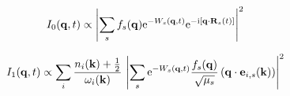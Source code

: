 \[ I_0(\mathbf{q}, t) \propto \left| \sum_s f_s(\mathbf{q}) \mathrm{e}^{-W_s(\mathbf{q},t)} \mathrm{e}^{-\mathrm{i}[\mathbf{q}\cdot\mathbf{R}_s(t)]} \right| ^2 \]

\[ I_1(\mathbf{q},t) \propto \sum_i \frac{n_i(\mathbf{k})+\frac{1}{2}}{\omega_i(\mathbf{k})}\,\left| \sum_s \mathrm{e}^{-W_s(\mathbf{q},t)} \frac{f_s(\mathbf{q})}{\sqrt{\mu_s}} \left( \mathbf{q}\cdot\mathbf{e}_{i, s}(\mathbf{k}) \right) \right|^2 \]

